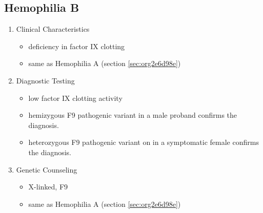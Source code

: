 \documentclass[12pt]{scrartcl}
\begin{document}
\subsection{Hemophilia B}
\label{sec:org6e12bee}
\begin{enumerate}
\item Clinical Characteristics
\label{sec:org278afe3}
\begin{itemize}
\item deficiency in factor IX clotting
\item same as Hemophilia A (section \ref{sec:org2e6d98e})
\end{itemize}
\item Diagnostic Testing
\label{sec:org8ad1daf}
\begin{itemize}
\item low factor IX clotting activity
\item hemizygous F9 pathogenic variant in a male proband confirms the
diagnosis.
\item heterozygous F9 pathogenic variant on in a symptomatic female
confirms the diagnosis.
\end{itemize}
\item Genetic Counseling
\label{sec:org0f6722c}
\begin{itemize}
\item X-linked, F9
\item same as Hemophilia A (section \ref{sec:org2e6d98e})
\end{itemize}
\end{enumerate}
\end{document}

